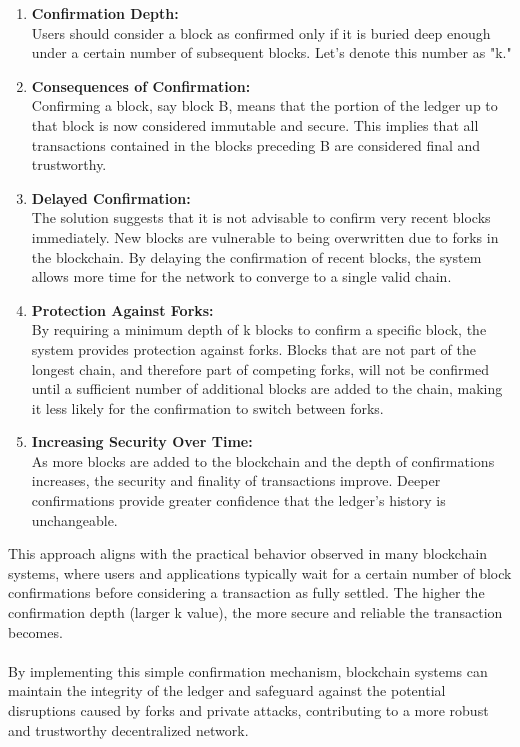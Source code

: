 \begin{enumerate}
    \item \textbf{Confirmation Depth:} \\Users should consider a block as confirmed only if it is buried deep enough under a certain number of subsequent blocks. Let's denote this number as "k."
    \item \textbf{Consequences of Confirmation:}\\Confirming a block, say block B, means that the portion of the ledger up to that block is now considered immutable and secure. This implies that all transactions contained in the blocks preceding B are considered final and trustworthy.
    \item \textbf{Delayed Confirmation:}\\The solution suggests that it is not advisable to confirm very recent blocks immediately. New blocks are vulnerable to being overwritten due to forks in the blockchain. By delaying the confirmation of recent blocks, the system allows more time for the network to converge to a single valid chain.
    \item \textbf{Protection Against Forks:}\\By requiring a minimum depth of k blocks to confirm a specific block, the system provides protection against forks. Blocks that are not part of the longest chain, and therefore part of competing forks, will not be confirmed until a sufficient number of additional blocks are added to the chain, making it less likely for the confirmation to switch between forks.
    \item \textbf{Increasing Security Over Time:}\\As more blocks are added to the blockchain and the depth of confirmations increases, the security and finality of transactions improve. Deeper confirmations provide greater confidence that the ledger's history is unchangeable.
\end{enumerate}
This approach aligns with the practical behavior observed in many blockchain systems, where users and applications typically wait for a certain number of block confirmations before considering a transaction as fully settled. The higher the confirmation depth (larger k value), the more secure and reliable the transaction becomes.\\\\
By implementing this simple confirmation mechanism, blockchain systems can maintain the integrity of the ledger and safeguard against the potential disruptions caused by forks and private attacks, contributing to a more robust and trustworthy decentralized network.\\\\
